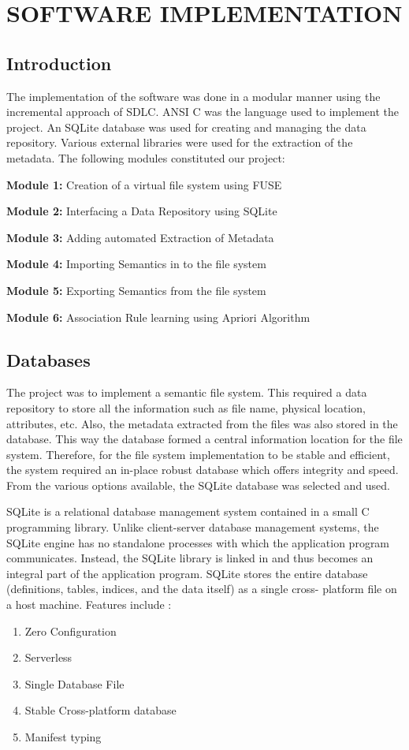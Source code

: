 \chapter{SOFTWARE IMPLEMENTATION}
\section{Introduction}
The implementation of the software was done in a modular manner using the incremental approach of SDLC. ANSI C was the language used to implement the project. An SQLite database was used for creating and managing the data repository. Various external libraries were used for the extraction of the metadata. The following modules constituted our project:
\begin{list}{•}{•}
\item \textbf{Module 1:} Creation of a virtual file system using FUSE
\item \textbf{Module 2:} Interfacing a Data Repository using SQLite
\item \textbf{Module 3:} Adding automated Extraction of Metadata 
\item \textbf{Module 4:} Importing Semantics in to the file system
\item \textbf{Module 5:} Exporting Semantics from the file system
\item \textbf{Module 6:} Association Rule learning using Apriori Algorithm
\end{list}

\section{Databases}
The project was to implement a semantic file system. This required a data repository to store all the information such as file name, physical location, attributes, etc. Also, the metadata extracted from the files was also stored in the database. This way the database formed a central information location for the file system. Therefore, for the file system implementation to be stable and efficient, the system required an in-place robust database which offers integrity and speed. From the various options available, the SQLite database was selected and used.

SQLite is a relational database management system contained in a small C
programming library. 
Unlike client-server database management systems, the SQLite engine has no
standalone processes with which the application program communicates. Instead,
the SQLite library is linked in and thus becomes an integral part of the application
program. SQLite stores the entire database (definitions, tables, indices, and the data
itself) as a single cross- platform file on a host machine. Features include :
\begin{enumerate}
\item Zero Configuration
\item Serverless
\item Single Database File
\item Stable Cross-platform database
\item Manifest typing
\end{enumerate}

